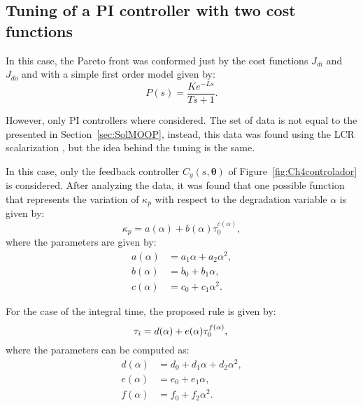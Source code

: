 \subsection{Tuning of a PI controller with two cost functions}
\label{sec:PI2FunMonica}
In this case, the Pareto front was conformed just by the cost functions $J_{di}$ and $J_{do}$ and with a simple first order model given by:
\begin{equation}
	P(s) = \frac{K e^{-Ls}}{Ts+1}.
\end{equation}

However, only PI controllers where considered. The set of data is not equal to the presented in Section~\ref{sec:SolMOOP}, instead, this data was found using the LCR scalarization \cite{Rojas2015b}, but the idea behind the tuning is the same.

In this case, only the feedback controller $C_y(s,\bm{\theta})$ of Figure~\ref{fig:Ch4controlador} is considered. After analyzing the data, it was found that one possible function that represents the variation of $\kappa_p$ with respect to the degradation variable $\alpha$ is given by:
\begin{equation}  %
\kappa_p = a(\alpha) +b(\alpha)\tau_0^{c(\alpha)},
\label{ec:KpMonica}
\end{equation}
%
where the parameters are given by:
\begin{align*}
%
a(\alpha) &=  a_1 \alpha + a_2 \alpha^2,\\%
%
b(\alpha) &=  b_0  + b_1 \alpha,\\%
%
c(\alpha) &=  c_0  + c_1 \alpha^2.%
\end{align*}

For the case of the integral time, the proposed rule is given by:
\begin{equation}  %
\tau_i = d(\alpha) +e(\alpha)\tau_0^{f(\alpha)},	\label{ec:TiMonica}\\
\end{equation}
%
where the parameters can be computed as:
\begin{align*}  %
d(\alpha) &= d_0 + d_1 \alpha + d_2 \alpha^2,\\
%
e(\alpha) &= e_0 + e_1 \alpha,\\
%
f(\alpha) &= f_0 + f_2 \alpha^2.\\
\end{align*}

